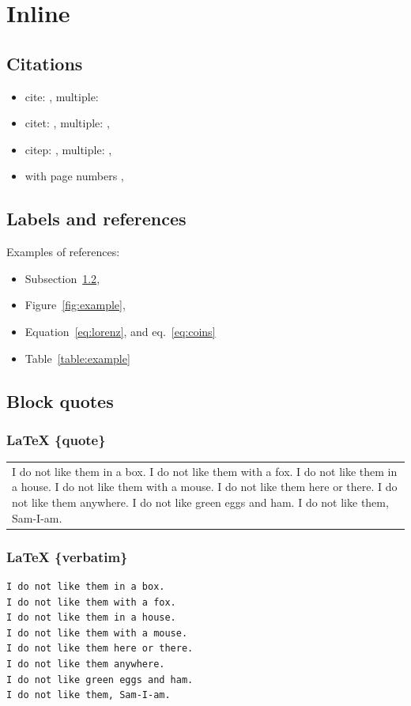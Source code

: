 \documentclass{article}
\renewenvironment{quote}
  {\begin{tabular}{|p{13cm}}}
  {\end{tabular}}
\providecommand\citet{\cite}
\providecommand\citep{\cite}
\begin{document}
\section{Inline}
\subsection{Citations}
\begin{itemize} 
\item cite: \cite{2016}, multiple: \cite{2016,Einstein_1922}
\item citet: \citet{2016}, multiple: \citet{2016,Einstein_1922},
\item citep: \citep{2016}, multiple: \citep{2016,Einstein_1922}, 
\item with page numbers \cite[pp.~2]{2016}, \cite[pp.~12-22]{Einstein_1922}
\end{itemize}

\subsection{Labels and references}\label{sec:labels}
Examples of references: 
\begin{itemize}
\item Subsection~\ref{sec:labels},
\item Figure~\ref{fig:example},
\item Equation~\ref{eq:lorenz}, and eq.~\ref{eq:coins}
\item Table~\ref{table:example}
\end{itemize}

\subsection{Block quotes}
\subsubsection{{\LaTeX} \{quote\}}
\begin{quote}
I do not like them in a box.
I do not like them with a fox.
I do not like them in a house.
I do not like them with a mouse.
I do not like them here or there.
I do not like them anywhere.
I do not like green eggs and ham.
I do not like them, Sam-I-am.
\end{quote}

\subsubsection{{\LaTeX} \{verbatim\}}
\begin{verbatim}
I do not like them in a box.
I do not like them with a fox.
I do not like them in a house.
I do not like them with a mouse.
I do not like them here or there.
I do not like them anywhere.
I do not like green eggs and ham.
I do not like them, Sam-I-am.
\end{verbatim}
\end{document}
